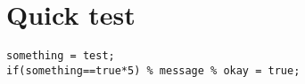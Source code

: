 \documentclass{article}
\begin{document}
\section{Quick test}

\begin{verbatim}
something = test;
if(something==true*5) % message % okay = true;
\end{verbatim}
\end{document}
